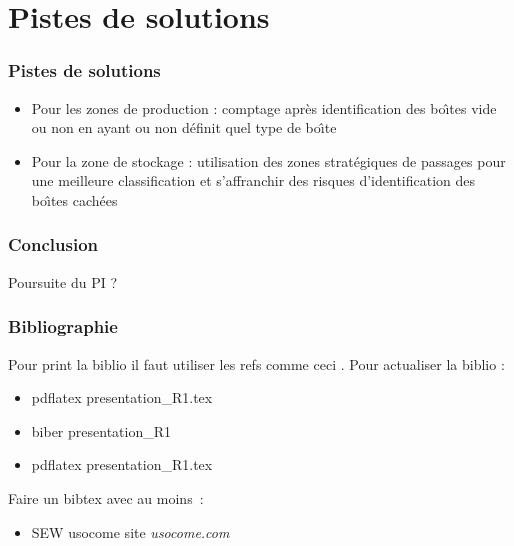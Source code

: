 \documentclass[aspectratio = 43]{beamer}
\begin{document}
\section{Pistes de solutions}
\begin{frame}
  \frametitle{Pistes de solutions}
  \begin{itemize}
  \item Pour les zones de production : comptage apr{\`e}s identification
    des bo{\^\i}tes vide ou non en ayant ou non d{\'e}finit quel type de bo{\^\i}te
  \item Pour la zone de stockage : utilisation des zones strat{\'e}giques
    de passages pour une meilleure classification et s'affranchir des
    risques d'identification des bo{\^\i}tes cach{\'e}es
  \end{itemize}
\end{frame}
%
\begin{frame}
  \frametitle{Conclusion}
  Poursuite du PI ?
\end{frame}
\begin{frame}
  \frametitle{Bibliographie}
  Pour print la biblio il faut utiliser les refs comme ceci
  \citeauthor{bib:ziou}. Pour actualiser la biblio :
  \begin{itemize}
  \item pdflatex presentation\_R1.tex
  \item biber presentation\_R1
  \item pdflatex presentation\_R1.tex
  \end{itemize}

  \printbibliography
  Faire un bibtex avec au moins~:
  \begin{itemize}
  \item SEW usocome site \textit{usocome.com}
  \end{itemize}
\end{frame}
\end{document}
